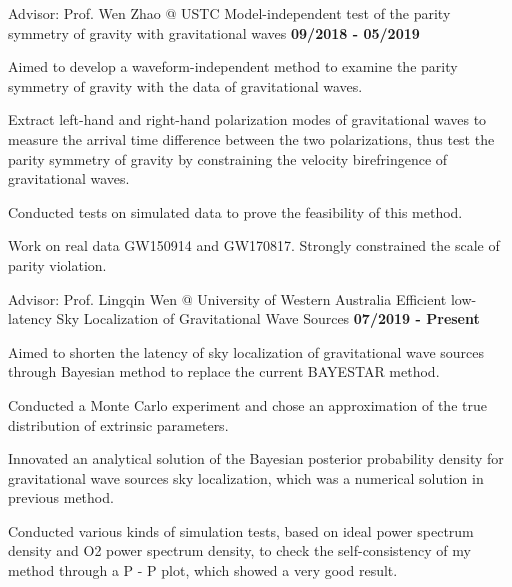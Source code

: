 
\begin{cventries}
\vspace{-0.1cm}
  \cventry
    {\textnormal{Advisor: Prof. Wen Zhao @ USTC}} %
    {Model-independent test of the parity symmetry of gravity with gravitational waves} %
    {\textcolor{awesome-emerald}{\textbf{09/2018 - 05/2019}}} %
    {} %
    {
      \begin{cvitems} %
        \item{\textnormal{Aimed to develop a waveform-independent method to examine the parity symmetry of gravity with the data of gravitational waves.}}
        \item{\textnormal{Extract left-hand and right-hand polarization modes of gravitational waves to measure the arrival time difference between the two polarizations, thus test the parity symmetry of gravity by constraining the velocity birefringence of gravitational waves.}}
        \item{\textnormal{Conducted tests on simulated data to prove the feasibility of this method.}}
        \item{\textnormal{Work on real data GW150914 and GW170817. Strongly constrained the scale of parity violation.}}
      \end{cvitems}
    }
  \vspace{0.4cm}
  \cventry
    {\textnormal{Advisor: Prof. Lingqin Wen @ University of Western Australia}} %
    {Efficient low-latency Sky Localization of Gravitational Wave Sources} %
    {\textcolor{awesome-emerald}{\textbf{07/2019 - Present}}} %
    {} %
    {
      \begin{cvitems} %
        \item{\textnormal{Aimed to shorten the latency of sky localization of gravitational wave sources through Bayesian method to replace the current BAYESTAR method.}}
        \item{\textnormal{Conducted a Monte Carlo experiment and chose an approximation of the true distribution of extrinsic parameters.}}
        \item {\textnormal{Innovated an analytical solution of the Bayesian posterior probability density for gravitational wave sources sky localization, which was a numerical solution in previous method.}}
        \item{\textnormal{Conducted various kinds of simulation tests, based on ideal power spectrum density and O2 power spectrum density, to check the self-consistency of my method through a P - P plot, which showed a very good result.}}
      \end{cvitems}
    }
  \vspace{-0.4cm}
\end{cventries}
